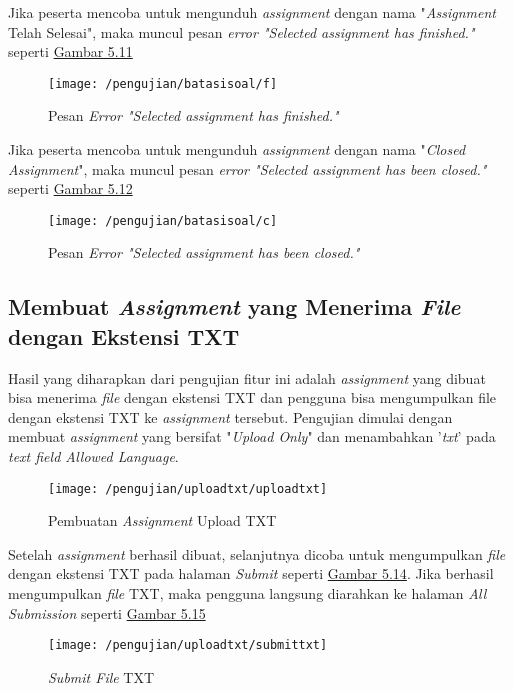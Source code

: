 	Jika peserta mencoba untuk mengunduh \textit{assignment} dengan nama "\textit{Assignment} Telah Selesai", maka muncul pesan \textit{error "Selected assignment has finished."} seperti \hyperref[fig:f]{Gambar 5.11} 
	\begin{figure}[H]
		\centering  
		\texttt{[image: /pengujian/batasisoal/f]}  
		\caption[Pesan\textit{ Error "Selected assignment has finished."}]{Pesan \textit{Error "Selected assignment has finished."}} 
		\label{fig:f} 
	\end{figure}

	Jika peserta mencoba untuk mengunduh \textit{assignment} dengan nama "\textit{Closed Assignment}", maka muncul pesan \textit{error "Selected assignment has been closed."} seperti \hyperref[fig:c]{Gambar 5.12} 
	\begin{figure}[H]
		\centering  
		\texttt{[image: /pengujian/batasisoal/c]}  
		\caption[Pesan \textit{Error "Selected assignment has been closed."}]{Pesan \textit{Error "Selected assignment has been closed."}} 
		\label{fig:c} 
	\end{figure}

	\subsection{Membuat \textit{Assignment} yang Menerima \textit{File} dengan Ekstensi TXT}
	Hasil yang diharapkan dari pengujian fitur ini adalah \textit{assignment} yang dibuat bisa menerima \textit{file} dengan ekstensi TXT dan pengguna bisa mengumpulkan file dengan ekstensi TXT ke \textit{assignment} tersebut. Pengujian dimulai dengan membuat \textit{assignment} yang bersifat "\textit{Upload Only}" dan menambahkan '\textit{txt}' pada \textit{text field Allowed Language}.
	\begin{figure}[H]
		\centering  
		\texttt{[image: /pengujian/uploadtxt/uploadtxt]}  
		\caption[Pembuatan \textit{Assignment} Upload TXT]{Pembuatan \textit{Assignment} Upload TXT} 
		\label{fig:uploadtxt} 
	\end{figure}
	
	Setelah \textit{assignment} berhasil dibuat, selanjutnya dicoba untuk mengumpulkan \textit{file} dengan ekstensi TXT pada halaman \textit{Submit} seperti \hyperref[fig:submittxt]{Gambar 5.14}. Jika berhasil mengumpulkan \textit{file} TXT, maka pengguna langsung diarahkan ke halaman \textit{All Submission} seperti \hyperref[fig:resultttxt]{Gambar 5.15}
	
	\begin{figure}[H]
		\centering  
		\texttt{[image: /pengujian/uploadtxt/submittxt]}  
		\caption[\textit{Submit File} TXT]{\textit{Submit File} TXT} 
		\label{fig:submittxt} 
	\end{figure}

